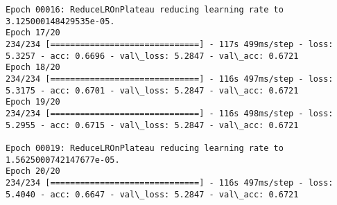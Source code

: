 \documentclass[11pt]{article}
\begin{document}
\begin{Verbatim}[commandchars=\\\{\}]
Epoch 00016: ReduceLROnPlateau reducing learning rate to 3.125000148429535e-05.
Epoch 17/20
234/234 [==============================] - 117s 499ms/step - loss: 5.3257 - acc: 0.6696 - val\_loss: 5.2847 - val\_acc: 0.6721
Epoch 18/20
234/234 [==============================] - 116s 497ms/step - loss: 5.3175 - acc: 0.6701 - val\_loss: 5.2847 - val\_acc: 0.6721
Epoch 19/20
234/234 [==============================] - 116s 498ms/step - loss: 5.2955 - acc: 0.6715 - val\_loss: 5.2847 - val\_acc: 0.6721

Epoch 00019: ReduceLROnPlateau reducing learning rate to 1.5625000742147677e-05.
Epoch 20/20
234/234 [==============================] - 116s 497ms/step - loss: 5.4040 - acc: 0.6647 - val\_loss: 5.2847 - val\_acc: 0.6721

    \end{Verbatim}
\end{document}
